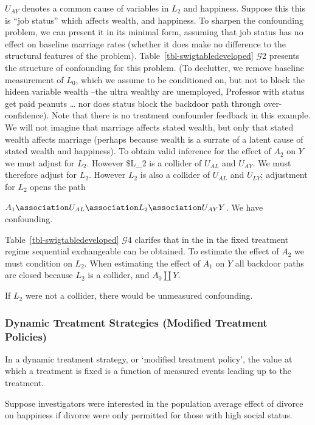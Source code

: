 \documentclass[
  single column]{article}
\begin{document}
\(U_{AY}\) denotes a common cause of variables in \(L_2\) and happiness.
Suppose this this is ``job status'' which affects wealth, and happiness.
To sharpen the confounding problem, we can present it in its minimal
form, assuming that job status has no effect on baseline marriage rates
(whether it does make no difference to the structural features of the
problem). Table~\ref{tbl-swigtabledeveloped} \(\mathcal{G}2\) presents
the structure of confounding for this problem. (To declutter, we remove
baseline measurement of \(L_0\), which we assume to be conditioned on,
but not to block the hideen variable wealth --the ultra wealthy are
unemployed, Professor with status get paid peanuts \ldots{} nor does
status block the backdoor path through over-confidence). Note that there
is no treatment confounder feedback in this example. We will not imagine
that marriage affects stated wealth, but only that stated wealth affects
marriage (perhaps because wealth is a surrate of a latent cause of
stated wealth and happiness). To obtain valid inference for the effect
of \(A_2\) on \(Y\) we must adjust for \(L_2\). However \$L\_2 is a
collider of \(U_{AL}\) and \(U_{AY}\). We must therefore adjust for
\(L_2\). However \(L_2\) is also a collider of \(U_{AL}\) and
\(U_{LY}\); adjustment for \(L_2\) opens the path

\(A_1 \association U_{AL} \association L_2 \association U_{AY} Y\). We
have confounding.

Table~\ref{tbl-swigtabledeveloped} \(\mathcal{G}4\) clarifes that in the
in the fixed treatment regime sequential exchangeable can be obtained.
To estimate the effect of \(A_2\) we must condition on \(L_2\). When
estimating the effect of \(A_1\) on \(Y\) all backdoor paths are closed
because \(L_2\) is a collider, and \(A_0 \coprod Y\).

If \(L_2\) were not a collider, there would be unmeasured confounding.

\subsubsection{Dynamic Treatment Strategies (Modified Treatment
Policies)}\label{dynamic-treatment-strategies-modified-treatment-policies}

In a dynamic treatment strategy, or `modified treatment policy', the
value at which a treatment is fixed is a function of measured events
leading up to the treatment.

Suppose investigators were interested in the population average effect
of divorce on happiness if divorce were only permitted for those with
high social status.
\end{document}
